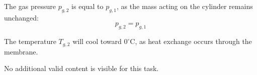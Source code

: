 The gas pressure \( p_{g,2} \) is equal to \( p_{g,1} \), as the mass acting on the cylinder remains unchanged:  
\[
p_{g,2} = p_{g,1}
\]  

The temperature \( T_{g,2} \) will cool toward \( 0^\circ\text{C} \), as heat exchange occurs through the membrane.  

No additional valid content is visible for this task.